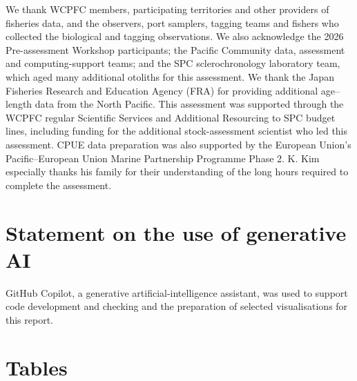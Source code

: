 \documentclass[
  english,
  a4paper,
  a4paper,
  11pt]{SCreport}
\begin{document}
We thank WCPFC members, participating territories and other providers of
fisheries data, and the observers, port samplers, tagging teams and
fishers who collected the biological and tagging observations. We also
acknowledge the 2026 Pre-assessment Workshop participants; the Pacific
Community data, assessment and computing-support teams; and the SPC
sclerochronology laboratory team, which aged many additional otoliths
for this assessment. We thank the Japan Fisheries Research and Education
Agency (FRA) for providing additional age--length data from the North
Pacific. This assessment was supported through the WCPFC regular
Scientific Services and Additional Resourcing to SPC budget lines,
including funding for the additional stock-assessment scientist who led
this assessment. CPUE data preparation was also supported by the
European Union's Pacific--European Union Marine Partnership Programme
Phase 2. K. Kim especially thanks his family for their understanding of
the long hours required to complete the assessment.

\section{Statement on the use of generative
AI}\label{statement-on-the-use-of-generative-ai}

GitHub Copilot, a generative artificial-intelligence assistant, was used
to support code development and checking and the preparation of selected
visualisations for this report.

\clearpage

\section{Tables}\label{tables}

\begingroup
\small
\setlength{\tabcolsep}{4pt}
\renewcommand{\arraystretch}{1.08}
\end{document}
